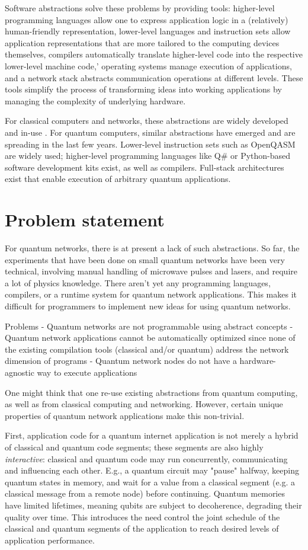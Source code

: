 Software abstractions solve these problems by providing tools:
higher-level programming languages allow one to express application logic in a (relatively) human-friendly representation,
lower-level languages and instruction sets allow application representations that are more tailored to the computing devices themselves,
compilers automatically translate higher-level code into the respective lower-level machine code,'
operating systems manage execution of applications,
and a network stack abstracts communication operations at different levels.
These tools simplify the process of transforming ideas into working applications by managing the complexity of underlying hardware.

For classical computers and networks, these abstractions are widely developed and in-use .
For quantum computers, similar abstractions have emerged and are spreading in the last few years.
Lower-level instruction sets such as OpenQASM are widely used;
higher-level programming languages like Q\# or Python-based software development kits exist, as well as compilers.
Full-stack architectures exist that enable execution of arbitrary quantum applications.


\section{Problem statement}
For quantum networks, there is at present a lack of such abstractions.
So far, the experiments that have been done on small quantum networks have been very technical, involving manual handling of microwave pulses and lasers, and require a lot of physics knowledge.
There aren't yet any programming languages, compilers, or a runtime system for quantum network applications.
This makes it difficult for programmers to implement new ideas for using quantum networks.

Problems
- Quantum networks are not programmable using abstract concepts
- Quantum network applications cannot be automatically optimized since none of the existing compilation tools (classical and/or quantum) address the network dimension of programs
- Quantum network nodes do not have a hardware-agnostic way to execute applications

One might think that one re-use existing abstractions from quantum computing, as well as from classical computing and networking.
However, certain unique properties of quantum network applications make this non-trivial.

First, application code for a quantum internet application is not merely a hybrid of classical and quantum code segments; these segments are also highly \textit{interactive}: classical and quantum code may run concurrently, communicating and influencing each other.
E.g., a quantum circuit may "pause" halfway, keeping quantum states in memory, and wait for a value from a classical segment (e.g. a classical message from a remote node) before continuing.
Quantum memories have limited lifetimes, meaning qubits are subject to decoherence, degrading their quality over time. This introduces the need 
control the joint schedule of the classical and quantum segments of the application to reach desired levels of application performance.

